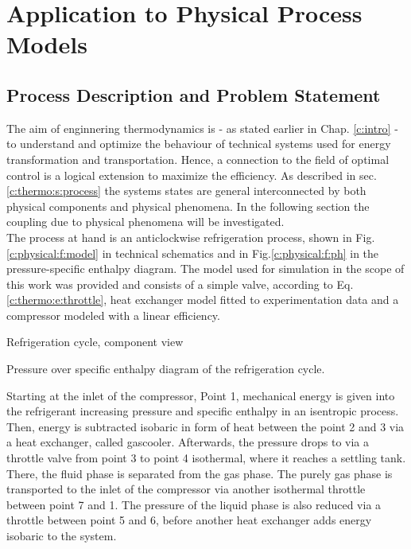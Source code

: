 \chapter{Application to Physical Process Models}
\label{c:physical}

\section{Process Description and Problem Statement} \label{c:physical:s:process}

The aim of enginnering thermodynamics is - as stated earlier in Chap. \ref{c:intro} - to understand and optimize the  behaviour of technical systems used for energy transformation and transportation. Hence, a connection to the field of optimal control is a logical extension to maximize the efficiency. As described in sec. \ref{c:thermo:s:process} the systems states are general interconnected by both physical components and physical phenomena. In the following section the coupling due to physical phenomena will be investigated.\\

The process at hand is an anticlockwise refrigeration process, shown in Fig.\ref{c:physical:f:model} in technical schematics and in Fig.\ref{c:physical:f:ph} in the pressure-specific enthalpy diagram. The model used for simulation in the scope of this work was provided and consists of a simple valve, according to Eq.\ref{c:thermo:e:throttle}, heat exchanger model fitted to experimentation data and a compressor modeled with a linear efficiency.\\

\begin{minipage}[c]{0.45\textwidth}

\caption{Refrigeration cycle, component view}
\label{c:physical:f:model}
\end{minipage}%
\hspace{0.05\textwidth}%
\begin{minipage}[c]{0.45\textwidth}

\caption{Pressure over specific enthalpy diagram of the refrigeration cycle. }
\label{c:physical:f:ph}
\end{minipage}

Starting at the inlet of the compressor, Point 1, mechanical energy is given into the refrigerant increasing pressure and specific enthalpy in an isentropic process. Then, energy is subtracted isobaric in form of heat between the point 2 and 3 via a heat exchanger, called gascooler. Afterwards, the pressure drops to via a throttle valve from point 3 to point 4 isothermal, where it reaches a settling tank. There, the fluid phase is separated from the gas phase. The purely gas phase is transported to the inlet of the compressor via another isothermal throttle between point 7 and 1. The pressure of the liquid phase is also reduced via a throttle between point 5 and 6, before another heat exchanger adds energy isobaric to the system.\\

